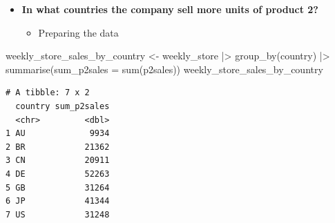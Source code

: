 \documentclass[
  ignorenonframetext,
]{beamer}
\newenvironment{Shaded}{\begin{snugshade}}{\end{snugshade}}
\newcommand{\AttributeTok}[1]{\textcolor[rgb]{0.40,0.45,0.13}{#1}}
\newcommand{\FunctionTok}[1]{\textcolor[rgb]{0.28,0.35,0.67}{#1}}
\newcommand{\NormalTok}[1]{\textcolor[rgb]{0.00,0.23,0.31}{#1}}
\newcommand{\OtherTok}[1]{\textcolor[rgb]{0.00,0.23,0.31}{#1}}
\newcommand{\SpecialCharTok}[1]{\textcolor[rgb]{0.37,0.37,0.37}{#1}}
\providecommand{\tightlist}{%
  \setlength{\itemsep}{0pt}\setlength{\parskip}{0pt}}\usepackage{longtable,booktabs,array}
\begin{document}
\begin{frame}[fragile]{}
\label{section-29}
\begin{itemize}
\item
  \textbf{In what countries the company sell more units of product 2?}

  \begin{itemize}
  \tightlist
  \item
    Preparing the data
  \end{itemize}
\end{itemize}

\tiny

\begin{Shaded}
\begin{Highlighting}[]
\NormalTok{weekly\_store\_sales\_by\_country }\OtherTok{\textless{}{-}}\NormalTok{ weekly\_store }\SpecialCharTok{|\textgreater{}} 
  \FunctionTok{group\_by}\NormalTok{(country) }\SpecialCharTok{|\textgreater{}}
  \FunctionTok{summarise}\NormalTok{(}\AttributeTok{sum\_p2sales =} \FunctionTok{sum}\NormalTok{(p2sales))}
\NormalTok{weekly\_store\_sales\_by\_country}
\end{Highlighting}
\end{Shaded}

\begin{verbatim}
# A tibble: 7 x 2
  country sum_p2sales
  <chr>         <dbl>
1 AU             9934
2 BR            21362
3 CN            20911
4 DE            52263
5 GB            31264
6 JP            41344
7 US            31248
\end{verbatim}
\end{frame}
\end{document}
